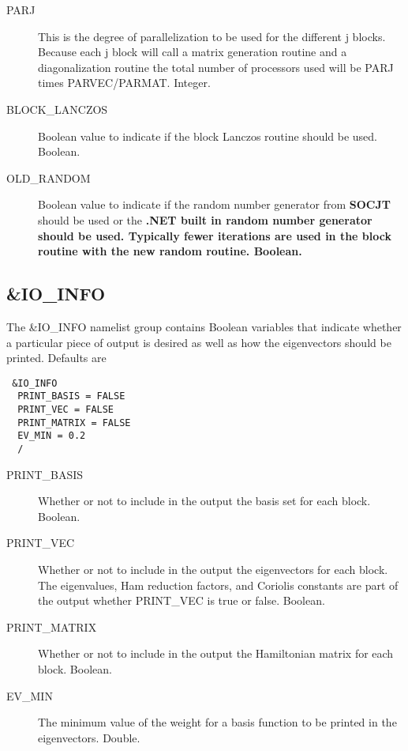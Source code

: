 \documentclass{article}
\newcommand{\socjt}{{\bf SOCJT }}
\begin{document}
\begin{description}
\item[PARJ] This is the degree of parallelization to be used for
  the different j blocks.  Because each j block will call a matrix
  generation routine and a diagonalization routine the total number
  of processors used will be PARJ times PARVEC/PARMAT. Integer.

\item[BLOCK\_LANCZOS] Boolean value to indicate if the block Lanczos
  routine should be used. Boolean.

\item[OLD\_RANDOM] Boolean value to indicate if the random number
  generator from \socjt should be used or the \bf{.NET} built in
  random number generator should be used. Typically fewer iterations
  are used in the block routine with the new random routine. Boolean.

\end{description}

\subsection{\&IO\_INFO}

The \&IO\_INFO namelist group contains Boolean variables that
indicate whether a particular piece of output is desired as well
as how the eigenvectors should be printed. Defaults are

\begin{verbatim}
 &IO_INFO
  PRINT_BASIS = FALSE
  PRINT_VEC = FALSE
  PRINT_MATRIX = FALSE
  EV_MIN = 0.2
  /
\end{verbatim}

\begin{description}

\item[PRINT\_BASIS] Whether or not to include in the output the basis
  set for each block. Boolean.

\item[PRINT\_VEC] Whether or not to include in the output the eigenvectors
  for each block. The eigenvalues, Ham reduction factors, and Coriolis
  constants are part of the output whether PRINT\_VEC is true or
  false. Boolean.

\item[PRINT\_MATRIX] Whether or not to include in the output the Hamiltonian
  matrix for each block. Boolean.
  
\item[EV\_MIN] The minimum value of the weight for a basis function to be 
  printed in the eigenvectors. Double.

\end{description}
\end{document}
